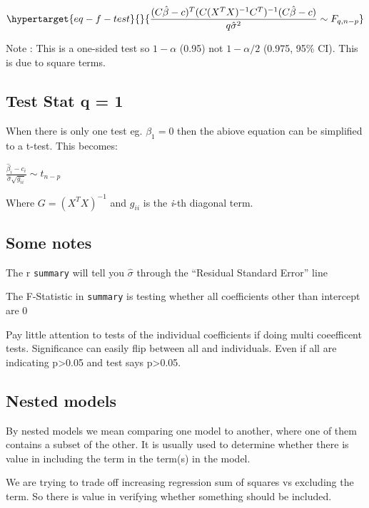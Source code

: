 \documentclass[
  letterpaper,
  DIV=11,
  numbers=noendperiod]{scrreprt}
\begin{document}
\begin{equation}\protect\hypertarget{eq-f-test}{}{\frac{(C \hat{\beta} -c )^T(C(X^TX)^{-1}C^T)^{-1}(C \hat{\beta} -c )}{q\hat{\sigma}^2} \sim F_{q, n-p}}\label{eq-f-test}\end{equation}

Note : This is a one-sided test so \(1-\alpha\) (0.95) not
\(1-\alpha / 2\) (0.975, 95\% CI). This is due to square terms.

\hypertarget{test-stat-q-1-1}{%
\subsection{Test Stat q = 1}\label{test-stat-q-1-1}}

When there is only one test eg. \(\beta_1=0\) then the abiove equation
can be simplified to a t-test. This becomes:

\(\frac{\hat{\beta}_i - c_i}{\hat{\sigma} \sqrt{g_{ii}}} \sim t_{n-p}\)

Where \(G = (X^TX)^{-1}\) and \(g_{ii}\) is the \emph{i}-th diagonal
term.

\hypertarget{some-notes}{%
\subsection{Some notes}\label{some-notes}}

The r \texttt{summary} will tell you \(\hat{\sigma}\) through the
``Residual Standard Error'' line

The F-Statistic in \texttt{summary} is testing whether all coefficients
other than intercept are 0

Pay little attention to tests of the individual coefficients if doing
multi coeefficent tests. Significance can easily flip between all and
individuals. Even if all are indicating p\textgreater0.05 and test says
p\textgreater0.05.

\hypertarget{nested-models}{%
\subsection{Nested models}\label{nested-models}}

By nested models we mean comparing one model to another, where one of
them contains a subset of the other. It is usually used to determine
whether there is value in including the term in the term(s) in the
model.

We are trying to trade off increasing regression sum of squares vs
excluding the term. So there is value in verifying whether something
should be included.
\end{document}
